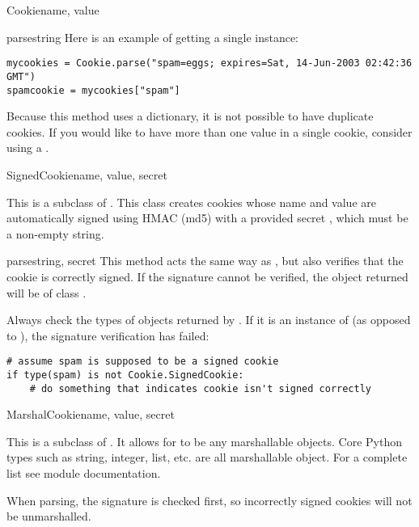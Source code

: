 \begin{classdesc}{Cookie}{name, value}
\begin{methoddesc}[Cookie]{parse}{string}
    Here is an example of getting a single  instance:
    \begin{verbatim}
mycookies = Cookie.parse("spam=eggs; expires=Sat, 14-Jun-2003 02:42:36 GMT")
spamcookie = mycookies["spam"]
    \end{verbatim}

    \begin{notice}
      Because this method uses a dictionary, it is not possible to
      have duplicate cookies. If you would like to have more than one
      value in a single cookie, consider using a .
    \end{notice}

  \end{methoddesc}

\end{classdesc}

\begin{classdesc}{SignedCookie}{name, value, secret}

  This is a subclass of . This class creates cookies
  whose name and value are automatically signed using HMAC (md5) with
  a provided secret , which must be a non-empty string.

  \begin{methoddesc}[SignedCookie]{parse}{string, secret}
    This method acts the same way as , but also
    verifies that the cookie is correctly signed. If the signature
    cannot be verified, the object returned will be of class
    .

    \begin{notice}
      Always check the types of objects returned by
      . If it is an instance of
       (as opposed to ), the
      signature verification has failed:
      \begin{verbatim}
# assume spam is supposed to be a signed cookie
if type(spam) is not Cookie.SignedCookie:
    # do something that indicates cookie isn't signed correctly
      \end{verbatim}
    \end{notice}
  \end{methoddesc}

\end{classdesc}

\begin{classdesc}{MarshalCookie}{name, value, secret}

  This is a subclass of . It allows for
   to be any marshallable objects. Core Python types such as
  string, integer, list, etc. are all marshallable object. For a
  complete list see
  module documentation.

  When parsing, the signature is checked first, so incorrectly signed cookies
  will not be unmarshalled.

\end{classdesc}

